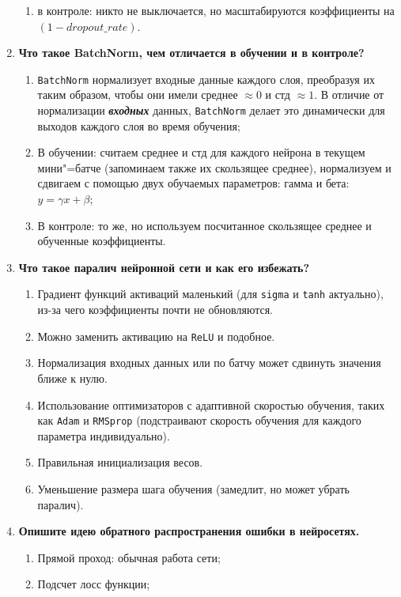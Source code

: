\documentclass{article}
\begin{document}
\begin{enumerate}
\begin{enumerate}
        \item в контроле: никто не выключается, но масштабируются коэффициенты на $(1 - dropout\_rate)$.
    \end{enumerate}
    \item \textbf{Что такое BatchNorm, чем отличается в обучении и в контроле?}  
    \begin{enumerate}
        \item \texttt{BatchNorm} нормализует входные данные каждого слоя, преобразуя их таким образом, чтобы они имели среднее $\approx 0$ и стд $\approx 1$. В отличие от  нормализации \textit{\textbf{входных}} данных, \texttt{BatchNorm} делает это динамически для выходов каждого слоя во время обучения;
        \item В обучении: считаем среднее и стд для каждого нейрона в текущем мини"=батче (запоминаем также их скользящее среднее), нормализуем и сдвигаем  с помощью двух обучаемых параметров: гамма и бета: $y=\gamma x + \beta$; 
        \item В контроле: то же, но используем посчитанное скользящее среднее и обученные коэффициенты.
    \end{enumerate}
    \item \textbf{Что такое паралич нейронной сети и как его избежать?} 
    \begin{enumerate}
        \item Градиент функций активаций маленький (для \texttt{sigma} и \texttt{tanh} актуально), из-за чего коэффициенты почти не обновляются. 
        \item Можно заменить активацию на \texttt{ReLU} и подобное.
        \item Нормализация входных данных или по батчу может сдвинуть значения ближе к нулю. 
        \item Использование оптимизаторов с адаптивной скоростью обучения, таких как \texttt{Adam} и \texttt{RMSprop} (подстраивают скорость обучения для каждого параметра индивидуально).
        \item Правильная инициализация весов.
        \item Уменьшение размера шага обучения (замедлит, но может убрать паралич).
    \end{enumerate}
    \item \textbf{Опишите идею обратного распространения ошибки в нейросетях.} 
    \begin{enumerate}
        \item Прямой проход: обычная работа сети;
        \item Подсчет лосс функции;

\end{enumerate}
\end{enumerate}
\end{document}
